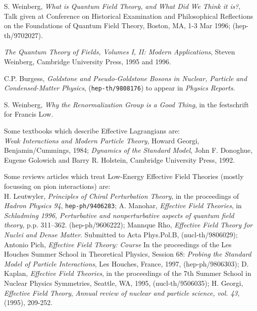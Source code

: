 \documentclass[12pt]{article}
\begin{document}
\begin{thebibliography}{99}
%
S. Weinberg, {\sl What is Quantum Field Theory, 
and What Did We Think it is?}, Talk given at Conference 
on Historical Examination and Philosophical Reflections on the
Foundations of Quantum Field Theory, Boston, MA, 1-3 Mar 1996;
(hep-th/9702027).

{\it The Quantum Theory of Fields, Volumes I,  II: Modern Applications}, 
Steven Weinberg,  Cambridge University Press, 1995 and 1996.

C.P. Burgess, {\sl Goldstone and Pseudo-Goldstone Bosons in 
Nuclear, Particle and Condensed-Matter Physics}, ({\tt hep-th/9808176})
to appear in {\it Physics Reports}.

S. Weinberg, {\sl Why the Renormalization Group is a Good
Thing}, in the festschrift for Francis Low.

Some textbooks which describe Effective Lagrangians are:\\
{\it Weak Interactions and Modern Particle Theory}, Howard Georgi,
Benjamin/Cummings, 1984;
{\it Dynamics of the Standard Model}, 
John F. Donoghue, Eugene Golowich and
Barry R. Holstein, Cambridge University Press, 1992.

Some reviews articles which treat Low-Energy Effective Field
Theories (mostly focussing on pion interactions) are:\\
H. Leutwyler, {\sl Principles of Chiral Perturbation Theory},
in the proceedings of {\it Hadron Physics 94}, {\tt hep-ph/9406283};
A. Manohar, {\sl Effective Field Theories},  in {\it Schladming 1996,
Perturbative and nonperturbative  aspects of quantum field theory}, p.p.
311--362. (hep-ph/9606222);
Mannque Rho, {\sl Effective Field Theory for Nuclei and Dense Matter}.
Submitted to Acta Phys.Pol.B, (nucl-th/9806029);
Antonio Pich, {\sl Effective Field Theory: Course} In the proceedings of the
Les Houches Summer School in Theoretical Physics,
Session 68: {\it Probing the Standard Model of Particle Interactions},
Les Houches, France, 1997, (hep-ph/9806303);
D. Kaplan, {\sl Effective Field Theories}, in the proceedings of the 7th Summer
School in Nuclear Physics
Symmetries, Seattle, WA, 1995, (nucl-th/9506035);
H. Georgi, {\sl Effective Field Theory},
{\it Annual review of nuclear and particle science, vol. 43},
(1995), 209-252.


\end{thebibliography}
\end{document}
